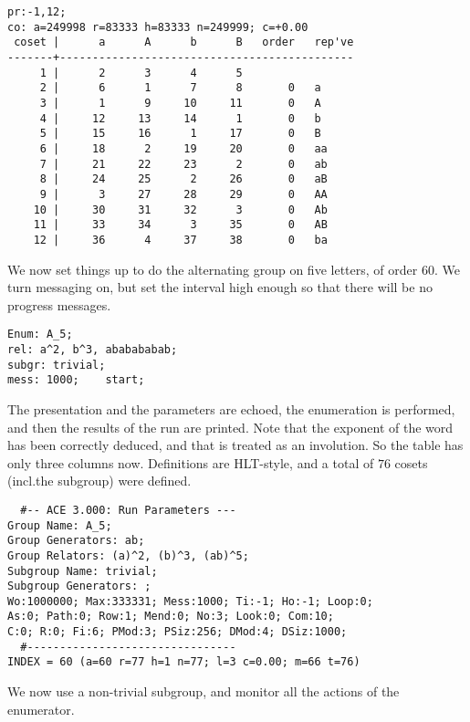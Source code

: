 \bv\begin{verbatim}
pr:-1,12;
co: a=249998 r=83333 h=83333 n=249999; c=+0.00
 coset |      a      A      b      B   order   rep've
-------+---------------------------------------------
     1 |      2      3      4      5
     2 |      6      1      7      8       0   a
     3 |      1      9     10     11       0   A
     4 |     12     13     14      1       0   b
     5 |     15     16      1     17       0   B
     6 |     18      2     19     20       0   aa
     7 |     21     22     23      2       0   ab
     8 |     24     25      2     26       0   aB
     9 |      3     27     28     29       0   AA
    10 |     30     31     32      3       0   Ab
    11 |     33     34      3     35       0   AB
    12 |     36      4     37     38       0   ba
\end{verbatim}\ev

We now set things up to do the alternating group on five letters, of order
  $60$.
We turn messaging on, but set the interval high enough so that there will
  be no progress messages.

\bv\begin{verbatim}
Enum: A_5;
rel: a^2, b^3, ababababab;
subgr: trivial;
mess: 1000;    start;
\end{verbatim}\ev

The presentation and the parameters are echoed, the enumeration is
  performed, and then the results of the run are printed.
Note that the exponent of the  word has been correctly
  deduced, and that  is treated as an involution.
So the table has only three columns now.
Definitions are HLT-style, and a total of $76$ cosets (incl.\@ the 
  subgroup) were defined.

\bv\begin{verbatim}
  #-- ACE 3.000: Run Parameters ---
Group Name: A_5;
Group Generators: ab;
Group Relators: (a)^2, (b)^3, (ab)^5;
Subgroup Name: trivial;
Subgroup Generators: ;
Wo:1000000; Max:333331; Mess:1000; Ti:-1; Ho:-1; Loop:0;
As:0; Path:0; Row:1; Mend:0; No:3; Look:0; Com:10;
C:0; R:0; Fi:6; PMod:3; PSiz:256; DMod:4; DSiz:1000;
  #--------------------------------
INDEX = 60 (a=60 r=77 h=1 n=77; l=3 c=0.00; m=66 t=76)
\end{verbatim}\ev

We now use a non-trivial subgroup, and monitor all the actions of the
  enumerator.

